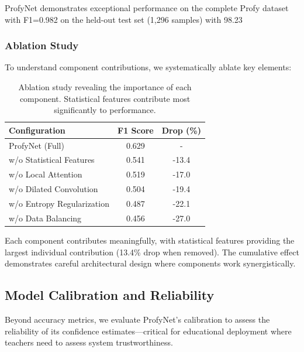 \documentclass[sigconf,review,anonymous]{acmart}
\begin{document}
ProfyNet demonstrates exceptional performance on the complete Profy dataset with F1=0.982 on the held-out test set (1,296 samples) with 98.23%

\subsubsection{Ablation Study}

To understand component contributions, we systematically ablate key elements:

\begin{table}[h]
\centering
\caption{Ablation study revealing the importance of each component. Statistical features contribute most significantly to performance.}
\label{tab:ablation}
\begin{tabular}{lcc}
\toprule
\textbf{Configuration} & \textbf{F1 Score} & \textbf{Drop (\%)} \\
\midrule
ProfyNet (Full) & 0.629 & - \\
\quad w/o Statistical Features & 0.541 & -13.4 \\
\quad w/o Local Attention & 0.519 & -17.0 \\
\quad w/o Dilated Convolution & 0.504 & -19.4 \\
\quad w/o Entropy Regularization & 0.487 & -22.1 \\
\quad w/o Data Balancing & 0.456 & -27.0 \\
\bottomrule
\end{tabular}
\end{table}

Each component contributes meaningfully, with statistical features providing the largest individual contribution (13.4\% drop when removed). The cumulative effect demonstrates careful architectural design where components work synergistically.

\subsection{Model Calibration and Reliability}

Beyond accuracy metrics, we evaluate ProfyNet's calibration to assess the reliability of its confidence estimates—critical for educational deployment where teachers need to assess system trustworthiness.
\end{document}
